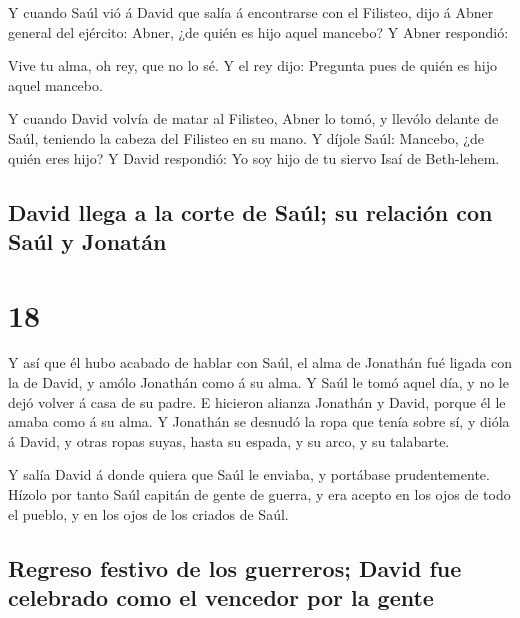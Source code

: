  Y cuando Saúl vió á David que salía á encontrarse con el
Filisteo, dijo á Abner general del ejército: Abner, ¿de quién es hijo
aquel mancebo? Y Abner respondió:

 Vive tu alma, oh rey, que no lo sé. Y el rey dijo:
Pregunta pues de quién es hijo aquel mancebo.

 Y cuando David volvía de matar al Filisteo, Abner lo
tomó, y llevólo delante de Saúl, teniendo la cabeza del Filisteo en su
mano.  Y díjole Saúl: Mancebo, ¿de quién eres hijo? Y
David respondió: Yo soy hijo de tu siervo Isaí de Beth-lehem.

\hypertarget{david-llega-a-la-corte-de-sauxfal-su-relaciuxf3n-con-sauxfal-y-jonatuxe1n}{%
\subsection{David llega a la corte de Saúl; su relación con Saúl y
Jonatán}\label{david-llega-a-la-corte-de-sauxfal-su-relaciuxf3n-con-sauxfal-y-jonatuxe1n}}

\hypertarget{section-17}{%
\section{18}\label{section-17}}

 Y así que él hubo acabado de hablar con Saúl, el alma de
Jonathán fué ligada con la de David, y amólo Jonathán como á su alma.
 Y Saúl le tomó aquel día, y no le dejó volver á casa de
su padre.  E hicieron alianza Jonathán y David, porque él
le amaba como á su alma.  Y Jonathán se desnudó la ropa
que tenía sobre sí, y dióla á David, y otras ropas suyas, hasta su
espada, y su arco, y su talabarte.

 Y salía David á donde quiera que Saúl le enviaba, y
portábase prudentemente. Hízolo por tanto Saúl capitán de gente de
guerra, y era acepto en los ojos de todo el pueblo, y en los ojos de los
criados de Saúl.

\hypertarget{regreso-festivo-de-los-guerreros-david-fue-celebrado-como-el-vencedor-por-la-gente}{%
\subsection{Regreso festivo de los guerreros; David fue celebrado como
el vencedor por la
gente}\label{regreso-festivo-de-los-guerreros-david-fue-celebrado-como-el-vencedor-por-la-gente}}

